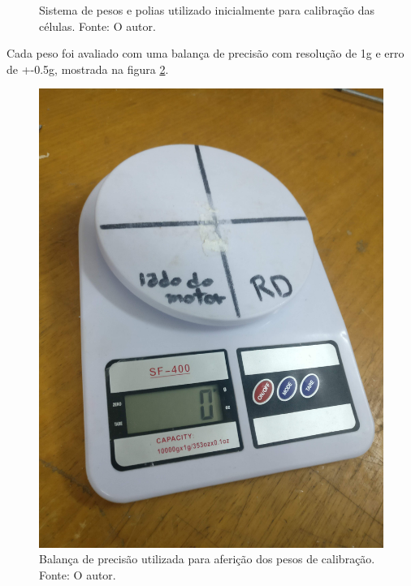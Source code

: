 \begin{figure}[!ht]
    \centering
    \caption{Sistema de pesos e polias utilizado inicialmente para calibração das células. Fonte: O autor.}
        \label{polias_1}
        \qquad
        \label{polias_2}
\end{figure}

Cada peso foi avaliado com uma balança de precisão com resolução de 1g e erro de +-0.5g, mostrada na figura \ref{fig:balanca_precisao}.

\begin{figure}[!ht]
    \centering
    \includegraphics[width=.4\linewidth]{figuras/calibracao/balanca_precisao.jpg}
    \caption{Balança de precisão utilizada para aferição dos pesos de calibração. Fonte: O autor.}
    \label{fig:balanca_precisao}
\end{figure}

